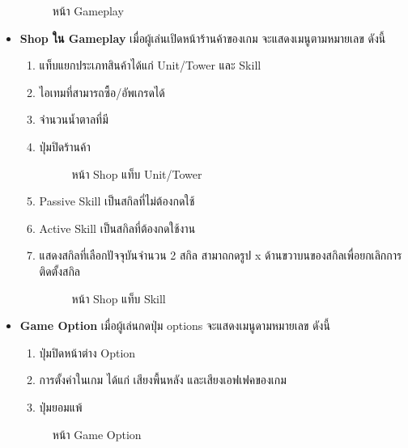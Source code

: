\documentclass[12pt,oneside,openright,a4paper]{cpe-thai-project}
\begin{document}
\begin{itemize}
  \begin{figure}[H]\centering
    \setlength{\fboxsep}{0cm}
    \caption{หน้า Gameplay}\label{fig:3-13}
  \end{figure}
  

  \item \textbf{Shop ใน Gameplay} เมื่อผู้เล่นเปิดหน้าร้านค้าของเกม จะแสดงเมนูตามหมายเลข ดังนี้
  \begin{enumerate}
    \item แท็บแยกประเภทสินค้าได้แก่ Unit/Tower และ Skill
    \item ไอเทมที่สามารถซื้อ/อัพเกรดได้
    \item จำนวนน้ำตาลที่มี
    \item ปุ่มปิดร้านค้า
    
    \begin{figure}[H]\centering
      \setlength{\fboxsep}{0cm}
      \caption{หน้า Shop แท็บ Unit/Tower}\label{fig:3-14}
    \end{figure}

\pagebreak
    \item Passive Skill เป็นสกิลที่ไม่ต้องกดใช้
    \item Active Skill เป็นสกิลที่ต้องกดใช้งาน
    \item แสดงสกิลที่เลือกปัจจุบันจำนวน 2 สกิล สามาถกดรูป x 
    ด้านขวาบนของสกิลเพื่อยกเลิกการติดตั้งสกิล

    \begin{figure}[H]\centering
      \setlength{\fboxsep}{0cm}
      \caption{หน้า Shop แท็บ Skill}\label{fig:3-15}
    \end{figure}

  \end{enumerate}
  

  \item \textbf{Game Option} เมื่อผู้เล่นกดปุ่ม options จะแสดงเมนูดามหมายเลข ดังนี้
  \begin{enumerate}
    \item ปุ่มปิดหน้าต่าง Option
    \item การตั้งค่าในเกม ได้แก่ เสียงพื้นหลัง และเสียงเอฟเฟคของเกม
    \item ปุ่มยอมแพ้
  \end{enumerate}

  \begin{figure}[H]\centering
    \setlength{\fboxsep}{0cm}
    \caption{หน้า Game Option}\label{fig:3-16}
  \end{figure}
  

\end{itemize}
\end{document}
